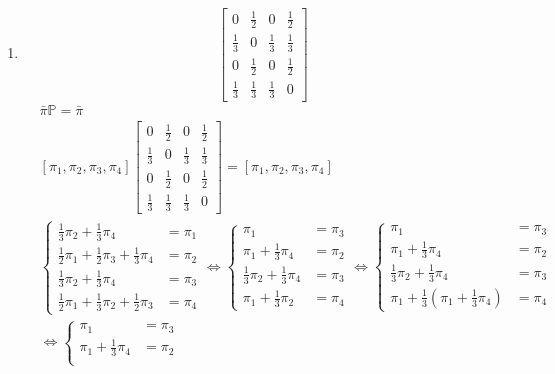 \begin{enumerate}[label=\alph*)]
\item 
$$\begin{bmatrix}
0&\frac{1}{2}&0&\frac{1}{2}\\
\frac{1}{3}&0&\frac{1}{3}&\frac{1}{3}\\
0&\frac{1}{2}&0&\frac{1}{2}\\
\frac{1}{3}&\frac{1}{3}&\frac{1}{3}&0
\end{bmatrix}$$
\begin{align*}
&\bar{\pi}\mathbb{P}=\bar{\pi}\\
&\left[\pi _1, \pi _2,\pi _3,\pi _4\right]\begin{bmatrix}
0&\frac{1}{2}&0&\frac{1}{2}\\
\frac{1}{3}&0&\frac{1}{3}&\frac{1}{3}\\
0&\frac{1}{2}&0&\frac{1}{2}\\
\frac{1}{3}&\frac{1}{3}&\frac{1}{3}&0
\end{bmatrix} = \left[\pi _1, \pi _2,\pi _3,\pi _4\right]\\
& \left\{\begin{matrix}
\frac{1}{3} \pi _2 + \frac{1}{3} \pi _4 &= \pi _1\\
\frac{1}{2} \pi _1 + \frac{1}{2} \pi _3 + \frac{1}{3} \pi _4 &= \pi _2\\
\frac{1}{3} \pi _2 + \frac{1}{3} \pi _4 &= \pi _3\\
\frac{1}{2} \pi _1 + \frac{1}{3} \pi _2 + \frac{1}{2} \pi _3 &= \pi _4
\end{matrix}\right. \Leftrightarrow \left\{\begin{matrix}
\pi _1  &= \pi _3\\
\pi _1 + \frac{1}{3} \pi _4 &= \pi _2\\
\frac{1}{3} \pi _2 + \frac{1}{3} \pi _4 &= \pi _3\\
\pi _1 + \frac{1}{3} \pi _2 &= \pi _4
\end{matrix}\right.\Leftrightarrow \left\{\begin{matrix}
\pi _1  &= \pi _3\\
\pi _1 + \frac{1}{3} \pi _4 &= \pi _2\\
\frac{1}{3} \pi _2 + \frac{1}{3} \pi _4 &= \pi _3\\
\pi _1 + \frac{1}{3}\left(\pi _1 + \frac{1}{3} \pi _4\right) &= \pi _4
\end{matrix}\right.\\
& \Leftrightarrow \left\{\begin{matrix}
\pi _1  &= \pi _3\\
\pi _1 + \frac{1}{3} \pi _4 &= \pi _2\\

\end{matrix}
\end{align*}
\end{enumerate}
